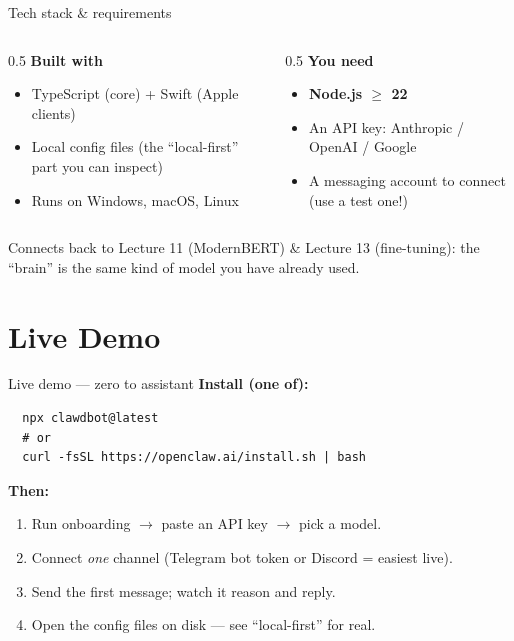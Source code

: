 \documentclass[aspectratio=169,11pt]{beamer}
\begin{document}
\begin{frame}{Tech stack \& requirements}
  \begin{columns}[T]
    \begin{column}{0.5\textwidth}
      \textbf{Built with}
      \begin{itemize}
        \item TypeScript (core) + Swift (Apple clients)
        \item Local config files (the ``local-first'' part you can inspect)
        \item Runs on Windows, macOS, Linux
      \end{itemize}
    \end{column}
    \begin{column}{0.5\textwidth}
      \textbf{You need}
      \begin{itemize}
        \item \textbf{Node.js $\geq$ 22}
        \item An API key: Anthropic / OpenAI / Google
        \item A messaging account to connect (use a \alert{test} one!)
      \end{itemize}
    \end{column}
  \end{columns}
  \vspace{1em}
  \begin{center}
    \scriptsize\color{clawGray}Connects back to Lecture 11 (ModernBERT) \& Lecture 13 (fine-tuning):
    the ``brain'' is the same kind of model you have already used.
  \end{center}
\end{frame}

\section{Live Demo}

\begin{frame}[fragile]{Live demo — zero to assistant}
  \textbf{Install (one of):}
\begin{verbatim}
  npx clawdbot@latest
  # or
  curl -fsSL https://openclaw.ai/install.sh | bash
\end{verbatim}
  \textbf{Then:}
  \begin{enumerate}
    \item Run onboarding $\to$ paste an API key $\to$ pick a model.
    \item Connect \emph{one} channel (Telegram bot token or Discord = easiest live).
    \item Send the first message; watch it reason and reply.
    \item Open the config files on disk — see ``local-first'' for real.
  \end{enumerate}
\end{frame}
\end{document}
